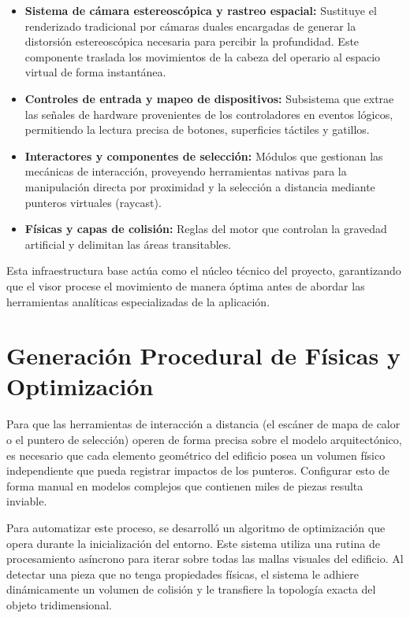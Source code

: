 \begin{itemize}
    \item \textbf{Sistema de cámara estereoscópica y rastreo espacial:} Sustituye el renderizado tradicional por cámaras duales encargadas de generar la distorsión estereoscópica necesaria para percibir la profundidad. Este componente traslada los movimientos de la cabeza del operario al espacio virtual de forma instantánea.
    \item \textbf{Controles de entrada y mapeo de dispositivos:} Subsistema que extrae las señales de hardware provenientes de los controladores en eventos lógicos, permitiendo la lectura precisa de botones, superficies táctiles y gatillos.
    \item \textbf{Interactores y componentes de selección:} Módulos que gestionan las mecánicas de interacción, proveyendo herramientas nativas para la manipulación directa por proximidad y la selección a distancia mediante punteros virtuales (raycast).
    \item \textbf{Físicas y capas de colisión:} Reglas del motor que controlan la gravedad artificial y delimitan las áreas transitables.
\end{itemize}

Esta infraestructura base actúa como el núcleo técnico del proyecto, garantizando que el visor procese el movimiento de manera óptima antes de abordar las herramientas analíticas especializadas de la aplicación.

\section{Generación Procedural de Físicas y Optimización}

Para que las herramientas de interacción a distancia (el escáner de mapa de calor o el puntero de selección) operen de forma precisa sobre el modelo arquitectónico, es necesario que cada elemento geométrico del edificio posea un volumen físico independiente que pueda registrar impactos de los punteros. Configurar esto de forma manual en modelos complejos que contienen miles de piezas resulta inviable.

Para automatizar este proceso, se desarrolló un algoritmo de optimización que opera durante la inicialización del entorno. Este sistema utiliza una rutina de procesamiento asíncrono para iterar sobre todas las mallas visuales del edificio. Al detectar una pieza que no tenga propiedades físicas, el sistema le adhiere dinámicamente un volumen de colisión y le transfiere la topología exacta del objeto tridimensional.

